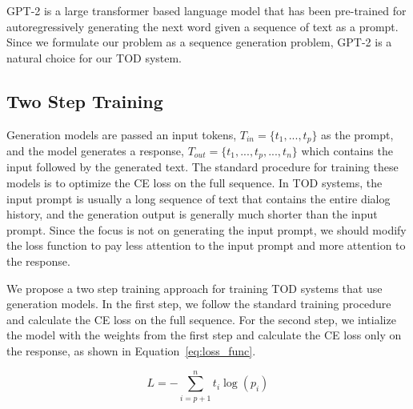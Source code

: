 GPT-2 is a large transformer based language model that has been pre-trained for autoregressively generating the next word given a sequence of text as a prompt.
Since we formulate our problem as a sequence generation problem, GPT-2 is a natural choice for our TOD system.

\subsection{Two Step Training}

Generation models are passed an input tokens, $T_{in} = \{t_1, ..., t_p\}$ as the prompt,
and the model generates a response, $T_{out} = \{t_1, ..., t_p, ..., t_n\}$ which contains the input followed by the generated text.
The standard procedure for training these models is to optimize the CE loss on the full sequence. In TOD systems,
the input prompt is usually a long sequence of text that contains the entire dialog history, and the generation output is generally much shorter than the input prompt.
Since the focus is not on generating the input prompt, we should modify the loss function to pay less attention to the input prompt and more attention to the response.

We propose a two step training approach for training TOD systems that use generation models.
In the first step, we follow the standard training procedure and calculate the CE loss on the full sequence.
For the second step, we intialize the model with the weights from the first step and calculate the CE loss only on the response,
as shown in Equation~\eqref{eq:loss_func}.

\begin{equation}
    L = - \sum_{i=p+1}^{n} t_i \log(p_i)
    \label{eq:loss_func}
\end{equation}
